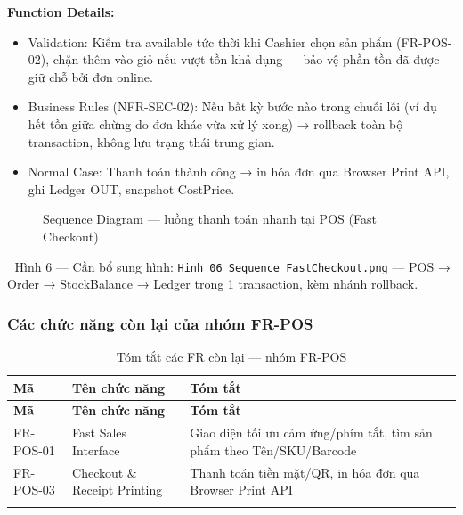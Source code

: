 \textbf{Function Details:}
\begin{itemize}
    \item Validation: Kiểm tra available tức thời khi Cashier chọn sản phẩm (FR-POS-02), chặn thêm vào giỏ nếu vượt tồn khả dụng — bảo vệ phần tồn đã được giữ chỗ bởi đơn online.
    \item Business Rules (NFR-SEC-02): Nếu bất kỳ bước nào trong chuỗi lỗi (ví dụ hết tồn giữa chừng do đơn khác vừa xử lý xong) → rollback toàn bộ transaction, không lưu trạng thái trung gian.
    \item Normal Case: Thanh toán thành công → in hóa đơn qua Browser Print API, ghi Ledger OUT, snapshot CostPrice.
\end{itemize}

\begin{figure}[H]
    \centering
    \caption{Sequence Diagram — luồng thanh toán nhanh tại POS (Fast Checkout)}
    \label{fig:seq-fast-checkout}
\end{figure}
\begin{imgnote}
📌 Hình 6 — Cần bổ sung hình: \texttt{Hinh\_06\_Sequence\_FastCheckout.png} — POS → Order → StockBalance → Ledger trong 1 transaction, kèm nhánh rollback.
\end{imgnote}

\subsubsection{Các chức năng còn lại của nhóm FR-POS}

\begin{longtable}{|p{2cm}|p{4.5cm}|p{7cm}|}
    \hline
    \textbf{Mã} & \textbf{Tên chức năng} & \textbf{Tóm tắt} \\
    \hline
    \endfirsthead
    \hline
    \textbf{Mã} & \textbf{Tên chức năng} & \textbf{Tóm tắt} \\
    \hline
    \endhead
    FR-POS-01 & Fast Sales Interface & Giao diện tối ưu cảm ứng/phím tắt, tìm sản phẩm theo Tên/SKU/Barcode \\
    \hline
    FR-POS-03 & Checkout \& Receipt Printing & Thanh toán tiền mặt/QR, in hóa đơn qua Browser Print API \\
    \hline
    \caption{Tóm tắt các FR còn lại — nhóm FR-POS}
\end{longtable}

